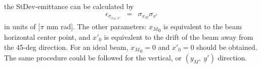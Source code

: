 \documentclass{article}
\begin{document}
the StDev-emittance can be calculated by
\begin{eqnarray*}
\epsilon_{\sigma_{x_M,x'}} & = & \sigma_{x_M} \sigma_{x'}
\end{eqnarray*}
in units of [$\pi$ mm rad]. The other parameters: ${x_M}_0$ is equivalent to the beam horizontal center point, and ${x'}_0$ is equivalent to the drift of the beam away from the 45-deg direction. For an ideal beam, ${x_M}_0 = 0$ and ${x'}_0 = 0$ should be obtained. The same procedure could be followed for the vertical, or $(y_M,\ y')$ direction.
\end{document}
